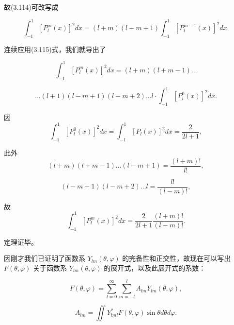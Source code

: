 故(3.114)可改写成

\begin{equation*}
\int_ {- 1} ^ {1} \left[ P _ {l} ^ {m} (x) \right] ^ {2} d x = (l + m) (l - m + 1) \int_ {- 1} ^ {1} \left[ P _ {l} ^ {m - 1} (x) \right] ^ {2} d x.\tag{3.115}
\end{equation*}

连续应用(3.115)式，我们就导出了

\begin{equation*}
\int_ {- 1} ^ {1} \left[ P _ {l} ^ {m} (x) \right] ^ {2} d x = (l + m) (l + m - 1) \dots
\end{equation*}

\begin{equation*}
\dots (l + 1) (l - m + 1) (l - m + 2) \dots l \cdot \int_ {- 1} ^ {1} [ P _ {l} ^ {0} (x) ] ^ {2} d x.
\end{equation*}

因
\begin{equation*}
\int_ {- 1} ^ {1} \left[ P _ {l} ^ {0} (x) \right] ^ {2} d x = \int_ {- 1} ^ {1} \left[ P _ {l} (x) \right] ^ {2} d x = \frac {2}{2 l + 1},
\end{equation*}

此外
\begin{equation*}
(l + m) (l + m - 1) \dots (l - m + 1) = \frac {(l + m) !}{l !},
\end{equation*}

\begin{equation*}
(l - m + 1) (l - m + 2) \dots l = \frac {l !}{(l - m) !},
\end{equation*}

故
\begin{equation*}
\int_ {- 1} ^ {1} \left[ P _ {l} ^ {m} (x) \right] ^ {2} d x = \frac {2}{2 l + 1} \frac {(l + m) !}{(l - m) !}.\tag{3.116}
\end{equation*}

定理证毕。

因刚才我们已证明了函数系 $Y_{lm}(\theta, \varphi)$ 的完备性和正交性，故现在可以写出 $F(\theta, \varphi)$ 关于函数系 $Y_{lm}(\theta, \varphi)$ 的展开式，以及此展开式的系数：

\begin{equation*}
F (\theta , \varphi) = \sum_ {l = 0} ^ {\infty} \sum_ {m = - l} ^ {l} A _ {l m} Y _ {l m} (\theta , \varphi),\tag{3.117}
\end{equation*}

\begin{equation*}
A _ {l m} = \iint Y _ {l m l} ^ {*} F (\theta , \varphi) \sin \theta d \theta d \varphi .\tag{3.118}
\end{equation*}

